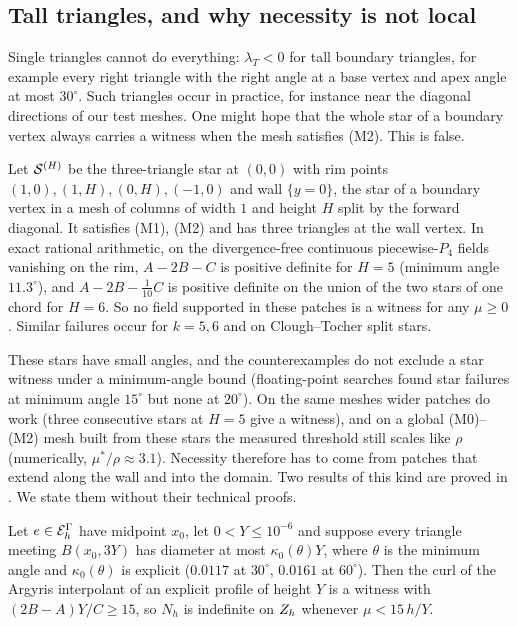 \subsection{Tall triangles, and why necessity is not local}
Single triangles cannot do everything: $\lambda_T<0$ for tall boundary triangles, for example every right triangle with the right angle at a base vertex and apex angle at most $30^\circ$. Such triangles occur in practice, for instance near the diagonal directions of our test meshes. One might hope that the whole star of a boundary vertex always carries a witness when the mesh satisfies (M2). This is false.

\begin{proposition}\label{prop:counter}
Let $\mathcal S^{(H)}$ be the three-triangle star at $(0,0)$ with rim points $(1,0),(1,H),(0,H),(-1,0)$ and wall $\{y=0\}$, the star of a boundary vertex in a mesh of columns of width $1$ and height $H$ split by the forward diagonal. It satisfies (M1), (M2) and has three triangles at the wall vertex. In exact rational arithmetic, on the divergence-free continuous piecewise-$P_4$ fields vanishing on the rim, $A-2B-C$ is positive definite for $H=5$ (minimum angle $11.3^\circ$), and $A-2B-\frac1{10}C$ is positive definite on the union of the two stars of one chord for $H=6$. So no field supported in these patches is a witness for any $\mu\ge0$. Similar failures occur for $k=5,6$ and on Clough--Tocher split stars.
\end{proposition}

These stars have small angles, and the counterexamples do not exclude a star witness under a minimum-angle bound (floating-point searches found star failures at minimum angle $15^\circ$ but none at $20^\circ$). On the same meshes wider patches do work (three consecutive stars at $H=5$ give a witness), and on a global (M0)--(M2) mesh built from these stars the measured threshold still scales like $\rho$ (numerically, $\mu^\ast/\rho\approx3.1$). Necessity therefore has to come from patches that extend along the wall and into the domain. Two results of this kind are proved in \cite{PadhiExt}. We state them without their technical proofs.

\begin{theorem}\label{thm:pbA}
Let $e\in\mathcal E_h^\Gamma$ have midpoint $x_0$, let $0<Y\le10^{-6}$ and suppose every triangle meeting $B(x_0,3Y)$ has diameter at most $\kappa_0(\theta)Y$, where $\theta$ is the minimum angle and $\kappa_0(\theta)$ is explicit ($0.0117$ at $30^\circ$, $0.0161$ at $60^\circ$). Then the curl of the Argyris interpolant of an explicit profile of height $Y$ is a witness with $(2B-A)Y/C\ge15$, so $N_h$ is indefinite on $Z_h$ whenever $\mu<15\,h/Y$.
\end{theorem}

